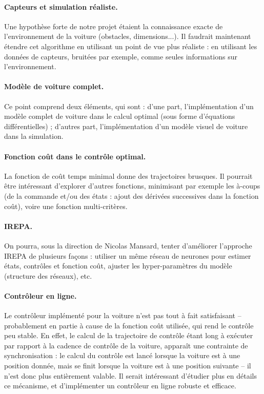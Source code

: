 \documentclass[a4paper,12pt]{report}
\begin{document}
\paragraph{Capteurs et simulation réaliste.} Une hypothèse forte de notre projet étaient la connaissance exacte de l'environnement de la voiture (obstacles, dimensions...). Il faudrait maintenant étendre cet algorithme en utilisant un point de vue plus réaliste : en utilisant les données de capteurs, bruitées par exemple, comme seules informations sur l'environnement.

\paragraph{Modèle de voiture complet.} Ce point comprend deux éléments, qui sont : d'une part, l'implémentation d'un modèle complet de voiture dans le calcul optimal (sous forme d'équations différentielles) ; d'autres part, l'implémentation d'un modèle visuel de voiture dans la simulation.

\paragraph{Fonction coût dans le contrôle optimal.} La fonction de coût temps minimal donne des trajectoires brusques. Il pourrait être intéressant d'explorer d'autres fonctions, minimisant par exemple les à-coups (de la commande et/ou des états : ajout des dérivées successives dans la fonction coût), voire une fonction multi-critères.

\paragraph{IREPA.} On pourra, sous la direction de Nicolas Mansard, tenter d'améliorer l'approche IREPA de plusieurs façons : utiliser un même réseau de neurones pour estimer états, contrôles et fonction coût, ajuster les hyper-paramètres du modèle (structure des réseaux), etc.

\paragraph{Contrôleur en ligne.}
Le contrôleur implémenté pour la voiture n'est pas tout à fait satisfaisant -- probablement en partie à cause de la fonction coût utilisée, qui rend le contrôle peu stable. En effet, le calcul de la trajectoire de contrôle étant long à exécuter par rapport à la cadence de contrôle de la voiture, apparaît une contrainte de synchronisation : le calcul du contrôle est lancé lorsque la voiture est à une position donnée, mais se finit lorsque la voiture est à une position suivante -- il n'est donc plus entièrement valable. Il serait intéressant d'étudier plus en détails ce mécanisme, et d'implémenter un contrôleur en ligne robuste et efficace. 
\end{document}
